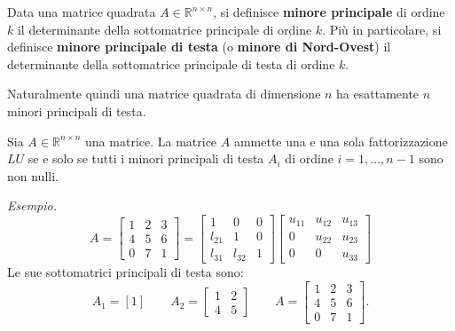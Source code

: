 \begin{definition}
    Data una matrice quadrata $A \in \mathbb{R}^{n\times n}$, si definisce \textbf{minore principale} di ordine $k$ il determinante della sottomatrice principale di ordine $k$. Più in particolare, si definisce \textbf{minore principale di testa} (o \textbf{minore di Nord-Ovest}) il determinante della sottomatrice principale di testa di ordine $k$.
\end{definition}
Naturalmente quindi una matrice quadrata di dimensione $n$ ha esattamente $n$ minori principali di testa.
\begin{theorem}
Sia $\displaystyle A\in \mathbb{R}^{n\times n}$ una matrice. La matrice $\displaystyle A$ ammette una e una sola fattorizzazione $\displaystyle LU$ se e solo se tutti i minori principali di testa $\displaystyle A_{i}$ di ordine $\displaystyle i=1,\dotsc ,n-1$ sono non nulli.
\label{thm:esist-unicita-LU}
\end{theorem}
\textit{Esempio.}
\begin{equation*}
A=\begin{bmatrix}
1 & 2 & 3\\
4 & 5 & 6\\
0 & 7 & 1
\end{bmatrix} =\begin{bmatrix}
1 & 0 & 0\\
l_{21} & 1 & 0\\
l_{31} & l_{32} & 1
\end{bmatrix}\begin{bmatrix}
u_{11} & u_{12} & u_{13}\\
0 & u_{22} & u_{23}\\
0 & 0 & u_{33}
\end{bmatrix}
\end{equation*}
Le sue sottomatrici principali di testa sono:
\begin{equation*}
A_{1} =[ 1] \qquad A_{2} =\begin{bmatrix}
1 & 2\\
4 & 5
\end{bmatrix} \qquad A=\begin{bmatrix}
1 & 2 & 3\\
4 & 5 & 6\\
0 & 7 & 1
\end{bmatrix}.
\end{equation*}
